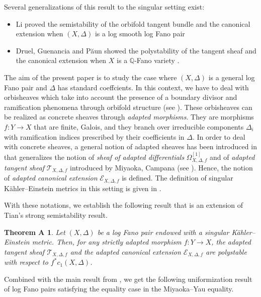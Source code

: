 \documentclass[12pt,a4paper]{amsart}
\newcommand{\Q}{\mathbb{Q}}
\theoremstyle{plain}
\newtheorem*{theoA}{Theorem A}
\theoremstyle{definition}
\begin{document}
Several generalizations of this result to the singular setting exist: 
\begin{itemize}
	\item Li proved the semistability of the orbifold tangent bundle and the canonical extension when $(X, \Delta)$ is a log smooth log Fano pair \cite{Li21}
	\item Druel, Guenancia and P\u{a}un showed the polystability of the tangent sheaf and the canonical extension when $X$ is a $\Q$-Fano variety \cite{DGP24}.
\end{itemize}

The aim of the present paper is to study the case where $(X, \Delta)$ is a general log Fano pair and $\Delta$ has standard coeffcients. In this context, we have to deal with orbisheaves which take into account the presence of a boundary divisor and ramification phenomena through orbifold structure (see \cite{GT22}). These orbisheaves can be realized as concrete sheaves through \emph{adapted morphisms}. They are morphisms $f :Y \to X$ that are finite, Galois, and they branch over irreducible components $\Delta_i$ with ramification indices prescribed by their coefficients in $\Delta$. In order to deal with concrete sheaves, a general notion of adapted sheaves has been introduced in \cite{Dai25} that generalizes the notion of \emph{sheaf of adapted differentials} $\Omega^{[1]}_{X, \Delta, f}$ and of \emph{adapted tangent sheaf} $\mathcal{T}_{X, \Delta, f}$ introduced by Miyaoka, Campana (see \cite{CKT16}). Hence, the notion of \emph{adapted canonical extension} $\mathcal{E}_{X, \Delta, f}$ is defined.
The definition of singular K\"ahler--Einstein metrics in this setting is given in \cite{BBEGZ19}.

With these notations, we establish the following result that is an extension of Tian's strong semistability result.

\begin{theoA}\label{Main Theorem}
    Let $(X, \Delta)$ be a log Fano pair endowed with a singular K\"ahler--Einstein metric. Then, for any strictly adapted morphism $f \colon Y \to X$, the adapted tangent sheaf $\mathcal{T}_{X, \Delta, f}$ and the adapted canonical extension $\mathcal{E}_{X, \Delta, f}$ are polystable with respect to $f^*c_1(X, \Delta)$.
\end{theoA}

Combined with the main result from \cite{Dai25}, we get the following uniformization result of log Fano pairs satisfying the equality case in the Miyaoka--Yau equality.
\end{document}
